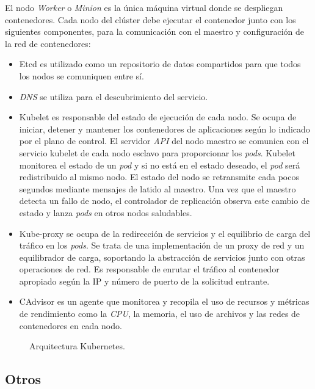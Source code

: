 El nodo \textit{Worker} o \textit{Minion} es la única máquina virtual donde se despliegan contenedores. Cada nodo del clúster debe ejecutar el contenedor junto con los siguientes componentes, para la comunicación con el maestro y configuración de la red de contenedores:
\begin{itemize}
\item Etcd es utilizado como un repositorio de datos compartidos para que todos los nodos se comuniquen entre sí.
\item \textit{DNS} se utiliza para el descubrimiento del servicio.
\item Kubelet es responsable del estado de ejecución de cada nodo. Se ocupa de iniciar, detener y mantener los contenedores de aplicaciones según lo indicado por el plano de control. El servidor \textit{API} del nodo maestro se comunica con el servicio kubelet de cada nodo esclavo para proporcionar los \textit{pods}. Kubelet monitorea el estado de un \textit{pod} y si no está en el estado deseado, el \textit{pod} será redistribuido al mismo nodo. El estado del nodo se retransmite cada pocos segundos mediante mensajes de latido al maestro. Una vez que el maestro detecta un fallo de nodo, el controlador de replicación observa este cambio de estado y lanza \textit{pods} en otros nodos saludables.
\item Kube-proxy se ocupa de la redirección de servicios y el equilibrio de carga del tráfico en los \textit{pods}. Se trata de una implementación de un proxy de red y un equilibrador de carga, soportando la abstracción de servicios junto con otras operaciones de red. Es responsable de enrutar el tráfico al contenedor apropiado según la IP y número de puerto de la solicitud entrante.
\item CAdvisor es un agente que monitorea y recopila el uso de recursos y métricas de rendimiento como la \textit{CPU}, la memoria, el uso de archivos y las redes de contenedores en cada nodo.
\end{itemize}

\begin{figure}[H]
\caption{Arquitectura Kubernetes.\label{fig:figure_placement_example}}
\end{figure}

\subsection{Otros}

